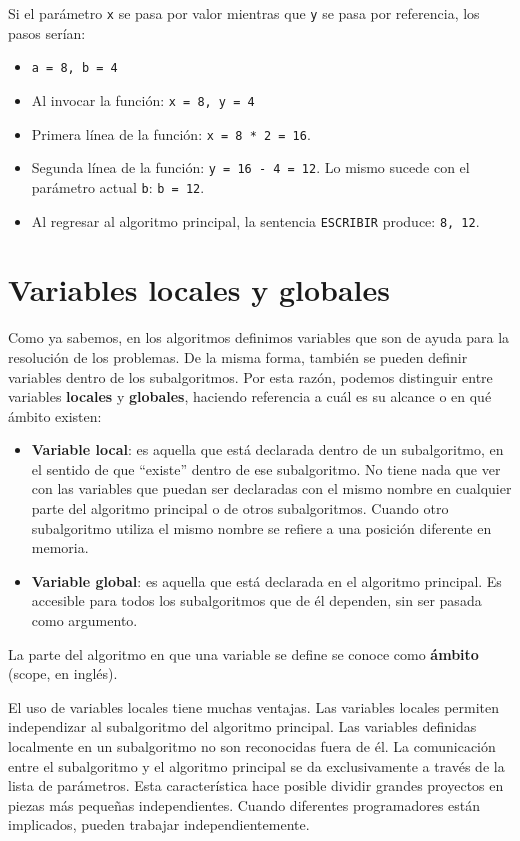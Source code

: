 \documentclass[]{book}
\providecommand{\tightlist}{%
  \setlength{\itemsep}{0pt}\setlength{\parskip}{0pt}}
\begin{document}
Si el parámetro \texttt{x} se pasa por valor mientras que \texttt{y} se
pasa por referencia, los pasos serían:

\begin{itemize}
\tightlist
\item
  \texttt{a\ =\ 8,\ b\ =\ 4}
\item
  Al invocar la función: \texttt{x\ =\ 8,\ y\ =\ 4}
\item
  Primera línea de la función: \texttt{x\ =\ 8\ *\ 2\ =\ 16}.
\item
  Segunda línea de la función: \texttt{y\ =\ 16\ -\ 4\ =\ 12}. Lo mismo
  sucede con el parámetro actual \texttt{b}: \texttt{b\ =\ 12}.
\item
  Al regresar al algoritmo principal, la sentencia \texttt{ESCRIBIR}
  produce: \texttt{8,\ 12}.
\end{itemize}

\section{Variables locales y
globales}\label{variables-locales-y-globales}

Como ya sabemos, en los algoritmos definimos variables que son de ayuda
para la resolución de los problemas. De la misma forma, también se
pueden definir variables dentro de los subalgoritmos. Por esta razón,
podemos distinguir entre variables \textbf{locales} y \textbf{globales},
haciendo referencia a cuál es su alcance o en qué ámbito existen:

\begin{itemize}
\tightlist
\item
  \textbf{Variable local}: es aquella que está declarada dentro de un
  subalgoritmo, en el sentido de que ``existe'' dentro de ese
  subalgoritmo. No tiene nada que ver con las variables que puedan ser
  declaradas con el mismo nombre en cualquier parte del algoritmo
  principal o de otros subalgoritmos. Cuando otro subalgoritmo utiliza
  el mismo nombre se refiere a una posición diferente en memoria.
\item
  \textbf{Variable global}: es aquella que está declarada en el
  algoritmo principal. Es accesible para todos los subalgoritmos que de
  él dependen, sin ser pasada como argumento.
\end{itemize}

La parte del algoritmo en que una variable se define se conoce como
\textbf{ámbito} (scope, en inglés).

El uso de variables locales tiene muchas ventajas. Las variables locales
permiten independizar al subalgoritmo del algoritmo principal. Las
variables definidas localmente en un subalgoritmo no son reconocidas
fuera de él. La comunicación entre el subalgoritmo y el algoritmo
principal se da exclusivamente a través de la lista de parámetros. Esta
característica hace posible dividir grandes proyectos en piezas más
pequeñas independientes. Cuando diferentes programadores están
implicados, pueden trabajar independientemente.
\end{document}
